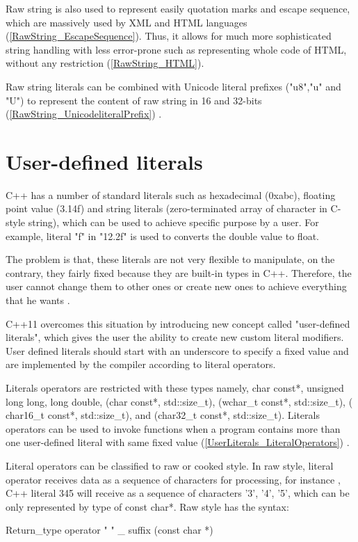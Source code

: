 \documentclass[11pt]{report}
\begin{document}
Raw string is also used to represent easily quotation marks and escape sequence, which are massively used by XML and HTML languages (\ref{RawString_EscapeSequence}). Thus, it allows for much more sophisticated string handling with less error-prone such as representing whole code of HTML, without any restriction (\ref{RawString_HTML}).

Raw string literals can be combined with Unicode literal prefixes  ("u8","u" and "U") to represent the content of raw string in 16 and 32-bits (\ref{RawString_UnicodeliteralPrefix}) \cite{Gregorie:professionalcpp}.

\section{User-defined literals}
\label{section: User-defined literals}
C++ has a number of standard literals such as hexadecimal (0xabc), floating point value (3.14f) and string literals (zero-terminated array of character in C-style string), which can be used to achieve specific purpose by a user. For example, literal "f" in "12.2f" is used to converts the double value to float. 


The problem is that, these literals are not very flexible to manipulate, on the contrary, they fairly fixed because they are built-in types in C++. Therefore, the user cannot change them to other ones or create new ones to achieve everything that he wants \cite{Overland:2011:CWF}.


C++11 overcomes this situation by introducing new concept called "user-defined literals", which gives the user the ability to create new custom literal modifiers. User defined literals should start with an underscore to specify a fixed value and are implemented by the compiler according to literal operators.


Literals operators are restricted with these types namely, char const*, unsigned long long, long double, (char const*, std::size\_t), (wchar\_t const*, std::size\_t), ( char16\_t const*, std::size\_t), and (char32\_t const*, std::size\_t). Literals operators can be used to invoke functions when a program contains more than one user-defined literal with same fixed value (\ref{UserLiterals_LiteralOperators}) \cite{Gregorie:professionalcpp}.


Literal operators can be classified to raw or cooked style. In raw style, literal operator receives data as a sequence of characters for processing, for instance , C++ literal 345 will receive as a sequence of characters '3', '4', '5', which can be only represented by type of  const char*. Raw style has the syntax:
\begin{center}
Return\_type  operator " " \_ suffix (const char *)
\end{center}
\end{document}
